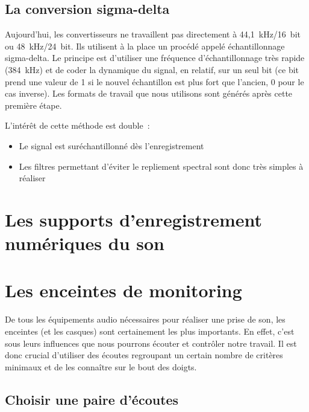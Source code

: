 \documentclass[
]{book}
\providecommand{\tightlist}{%
  \setlength{\itemsep}{0pt}\setlength{\parskip}{0pt}}
\begin{document}
\hypertarget{la-conversion-sigma-delta}{%
\section{La conversion sigma-delta}\label{la-conversion-sigma-delta}}

Aujourd'hui, les convertisseurs ne travaillent pas directement à 44,1~kHz/16~bit ou 48~kHz/24~bit. Ils utilisent à la place un procédé appelé échantillonnage sigma-delta. Le principe est d'utiliser une fréquence d'échantillonnage très rapide (384~kHz) et de coder la dynamique du signal, en relatif, sur un seul bit (ce bit prend une valeur de 1 si le nouvel échantillon est plus fort que l'ancien, 0 pour le cas inverse). Les formats de travail que nous utilisons sont générés après cette première étape.

L'intérêt de cette méthode est double~:

\begin{itemize}
\tightlist
\item
  Le signal est suréchantillonné dès l'enregistrement
\item
  Les filtres permettant d'éviter le repliement spectral sont donc très simples à réaliser
\end{itemize}

\hypertarget{les-supports-denregistrement-numuxe9riques-du-son}{%
\chapter{Les supports d'enregistrement numériques du son}\label{les-supports-denregistrement-numuxe9riques-du-son}}

\hypertarget{les-enceintes-de-monitoring}{%
\chapter{Les enceintes de monitoring}\label{les-enceintes-de-monitoring}}

De tous les équipements audio nécessaires pour réaliser une prise de son, les enceintes (et les casques) sont certainement les plus importants. En effet, c'est sous leurs influences que nous pourrons écouter et contrôler notre travail. Il est donc crucial d'utiliser des écoutes regroupant un certain nombre de critères minimaux et de les connaître sur le bout des doigts.

\hypertarget{choisir-une-paire-duxe9coutes}{%
\section{Choisir une paire d'écoutes}\label{choisir-une-paire-duxe9coutes}}
\end{document}
